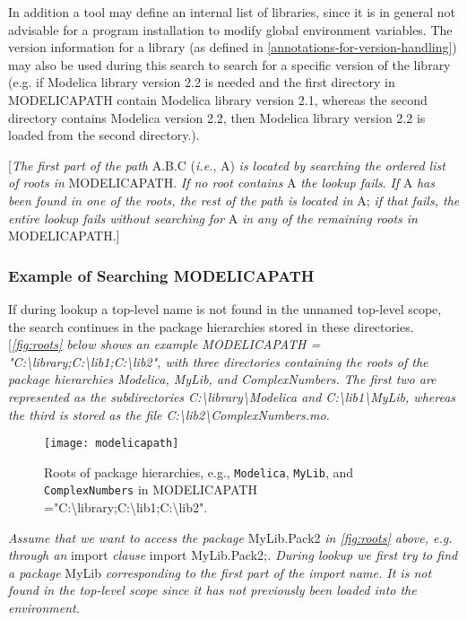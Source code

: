 \documentclass[../MLS.tex]{subfiles}
\begin{document}
In addition a tool may define an internal list of libraries, since it is
in general not advisable for a program installation to modify global
environment variables. The version information for a library (as defined
in \autoref{annotations-for-version-handling}) may also be used during this search to search for a
specific version of the library (e.g. if Modelica library version 2.2 is
needed and the first directory in MODELICAPATH contain Modelica library
version 2.1, whereas the second directory contains Modelica version 2.2,
then Modelica library version 2.2 is loaded from the second directory.).

{[}\emph{The first part of the path} A.B.C (\emph{i.e.}, A) \emph{is
located by searching the ordered list of roots in} MODELICAPATH.
\emph{If no root contains} A \emph{the lookup fails}. \emph{If} A
\emph{has been found in one of the roots, the rest of the path is
located in} A; \emph{if that fails, the entire lookup fails without
searching} \emph{for} A \emph{in any of the remaining roots in}
MODELICAPATH.{]}

\subsubsection{Example of Searching MODELICAPATH}

If during lookup a top-level name is not found in the unnamed top-level
scope, the search continues in the package hierarchies stored in these
directories. {[}\emph{\autoref{fig:roots} below shows an example MODELICAPATH =
"C:\textbackslash{}library;C:\textbackslash{}lib1;C:\textbackslash{}lib2",
with three directories containing the roots of the package hierarchies
Modelica, MyLib, and ComplexNumbers. The first two are represented as
the subdirectories C:\textbackslash{}library\textbackslash{}Modelica and
C:\textbackslash{}lib1\textbackslash{}MyLib, whereas the third is stored
as the file C:\textbackslash{}lib2\textbackslash{}ComplexNumbers.mo.}

\begin{figure}[H]
\caption{Roots of package hierarchies, e.g.,
\lstinline!Modelica!, \lstinline!MyLib!, and \lstinline!ComplexNumbers! in
MODELICAPATH ="C:\textbackslash{}library;C:\textbackslash{}lib1;C:\textbackslash{}lib2".
\label{fig:roots}}
\texttt{[image: modelicapath]}
\end{figure}

\emph{Assume that we want to access the package} MyLib.Pack2 \emph{in
\autoref{fig:roots} above, e.g. through an} import \emph{clause} import
MyLib.Pack2;\emph{. During lookup we first try to find a package} MyLib
\emph{corresponding to the first part of the import name. It is not
found in the top-level scope since it has not previously been loaded
into the environment. }
\end{document}
